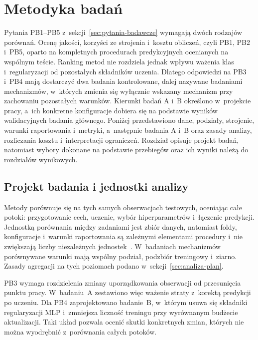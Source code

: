 \clearpage
\section{Metodyka badań}
\label{chap:metodyka}

Pytania PB1--PB5 z~sekcji~\ref{sec:pytania-badawcze} wymagają dwóch rodzajów porównań. Ocenę jakości, korzyści ze strojenia i~kosztu obliczeń, czyli PB1, PB2 i~PB5, oparto na kompletnych procedurach predykcyjnych ocenianych na wspólnym teście. Ranking metod nie rozdziela jednak wpływu ważenia klas i~regularyzacji od pozostałych składników uczenia. Dlatego odpowiedzi na PB3 i~PB4 mają dostarczyć dwa badania kontrolowane, dalej nazywane badaniami mechanizmów, w~których zmienia się wyłącznie wskazany mechanizm przy zachowaniu pozostałych warunków. Kierunki badań A i~B określono w~projekcie pracy, a~ich konkretne konfiguracje dobiera się na podstawie wyników walidacyjnych badania głównego. Poniżej przedstawiono dane, podziały, strojenie, warunki raportowania i~metryki, a~następnie badania A i~B oraz zasady analizy, rozliczania kosztu i~interpretacji ograniczeń. Rozdział opisuje projekt badań, natomiast wybory dokonane na podstawie przebiegów oraz ich wyniki należą do rozdziałów wynikowych.

\subsection{Projekt badania i jednostki analizy}
\label{sec:projekt-badania}

Metody porównuje się na tych samych obserwacjach testowych, oceniając całe potoki: przygotowanie cech, uczenie, wybór hiperparametrów i~łączenie predykcji. Jednostką porównania między zadaniami jest zbiór danych, natomiast foldy, konfiguracje i~warunki raportowania są zależnymi elementami procedury i~nie zwiększają liczby niezależnych jednostek~\cite{demsar2006comparisons}. W~badaniach mechanizmów porównywane warunki mają wspólny podział, podzbiór treningowy i~ziarno. Zasady agregacji na tych poziomach podano w~sekcji~\ref{sec:analiza-plan}.

PB3 wymaga rozdzielenia zmiany uporządkowania obserwacji od przesunięcia punktu pracy. W~badaniu~A zestawiono więc ważenie straty z~korektą predykcji po uczeniu. Dla PB4 zaprojektowano badanie~B, w~którym usuwa się składniki regularyzacji MLP i~zmniejsza liczność treningu przy wyrównanym budżecie aktualizacji. Taki układ pozwala ocenić skutki konkretnych zmian, których nie można wyodrębnić z~porównania całych potoków.

